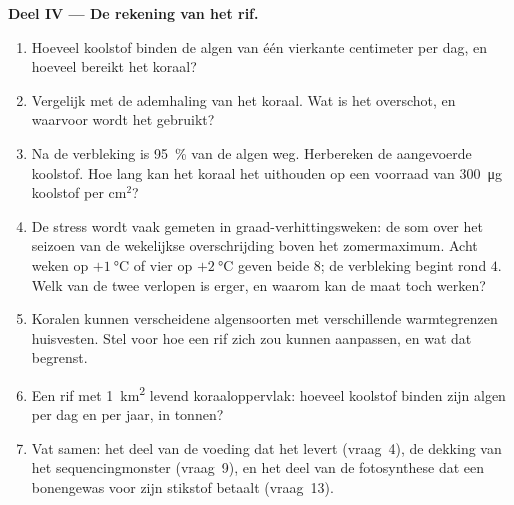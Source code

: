 \begin{problem}
\medskip
\noindent\textbf{Deel IV --- De rekening van het rif.}
\begin{enumerate}[resume]
  \item Hoeveel koolstof binden de algen van één vierkante centimeter
        per dag, en hoeveel bereikt het koraal?
  \item Vergelijk met de ademhaling van het koraal. Wat is het
        overschot, en waarvoor wordt het gebruikt?
  \item Na de verbleking is \qty{95}{\%} van de algen weg. Herbereken de
        aangevoerde koolstof. Hoe lang kan het koraal het uithouden op
        een voorraad van \qty{300}{\micro g} koolstof per cm$^{2}$?
  \item De stress wordt vaak gemeten in graad-verhittingsweken: de som
        over het seizoen van de wekelijkse overschrijding boven het
        zomermaximum. Acht weken op $+\qty{1}{\celsius}$ of vier op
        $+\qty{2}{\celsius}$ geven beide $8$; de verbleking begint rond
        $4$. Welk van de twee verlopen is erger, en waarom kan de maat
        toch werken?
  \item Koralen kunnen verscheidene algensoorten met verschillende
        warmtegrenzen huisvesten. Stel voor hoe een rif zich zou kunnen
        aanpassen, en wat dat begrenst.
  \item Een rif met \qty{1}{km^2} levend koraaloppervlak: hoeveel
        koolstof binden zijn algen per dag en per jaar, in tonnen?
  \item Vat samen: het deel van de voeding dat het  levert
        (vraag~4), de dekking van het sequencingmonster (vraag~9), en
        het deel van de fotosynthese dat een bonengewas voor zijn
        stikstof betaalt (vraag~13).
\end{enumerate}
\end{problem}
